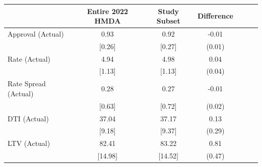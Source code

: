{
\def\sym#1{\ifmmode^{#1}\else\(^{#1}\)\fi}
\begin{tabular}{l*{3}{cc}}
\toprule
                    &\multicolumn{1}{c}{Entire 2022 HMDA}&\multicolumn{1}{c}{Study Subset}&\multicolumn{1}{c}{Difference}\\
\midrule
Approval (Actual)   &        0.93&        0.92&       -0.01         \\
                    &      [0.26]&      [0.27]&      (0.01)         \\
Rate (Actual)       &        4.94&        4.98&        0.04         \\
                    &      [1.13]&      [1.13]&      (0.04)         \\
Rate Spread (Actual)&        0.28&        0.27&       -0.01         \\
                    &      [0.63]&      [0.72]&      (0.02)         \\
DTI (Actual)        &       37.04&       37.17&        0.13         \\
                    &      [9.18]&      [9.37]&      (0.29)         \\
LTV (Actual)        &       82.41&       83.22&        0.81         \\
                    &     [14.98]&     [14.52]&      (0.47)         \\
\bottomrule
\end{tabular}
}
